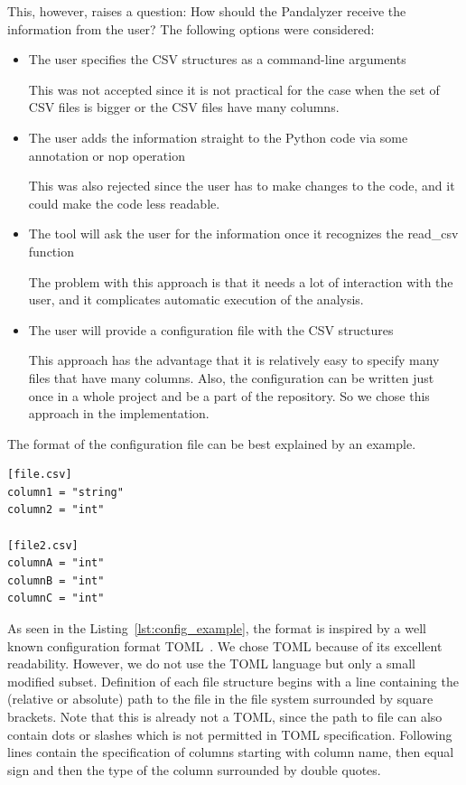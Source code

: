 This, however, raises a question: How should the Pandalyzer receive the information from the user?
The following options were considered:
\begin{itemize}
    \item The user specifies the CSV structures as a command-line arguments

    This was not accepted since it is not practical for the case when the set of CSV files is bigger or the CSV files
    have many columns.

    \item The user adds the information straight to the Python code via some annotation or nop operation

    This was also rejected since the user has to make changes to the code, and it could make the code less readable.

    \item The tool will ask the user for the information once it recognizes the read\_csv function

    The problem with this approach is that it needs a lot of interaction with the user, and it complicates automatic
    execution of the analysis.

    \item The user will provide a configuration file with the CSV structures

    This approach has the advantage that it is relatively easy to specify many files that have many columns.
    Also, the configuration can be written just once in a whole project and be a part of the repository.
    So we chose this approach in the implementation.
\end{itemize}

The format of the configuration file can be best explained by an example.

\begin{lstlisting}[caption=An example configuration file, label={lst:config_example}, captionpos=b]
[file.csv]
column1 = "string"
column2 = "int"

[file2.csv]
columnA = "int"
columnB = "int"
columnC = "int"
\end{lstlisting}

As seen in the Listing~\ref{lst:config_example}, the format is inspired by a well known configuration format
TOML~\cite{toml_spec}.
We chose TOML because of its excellent readability.
However, we do not use the TOML language but only a small modified subset.
Definition of each file structure begins with a line containing the (relative or absolute) path to the file in the file
system surrounded by square brackets.
Note that this is already not a TOML, since the path to file can also contain dots or slashes which is not permitted in
TOML specification.
Following lines contain the specification of columns starting with column name, then equal sign and then the type of the
column surrounded by double quotes.


